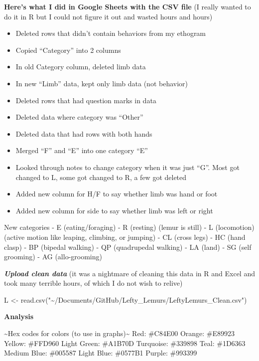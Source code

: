 \documentclass[
  letterpaper,
  DIV=11,
  numbers=noendperiod]{scrartcl}
\newenvironment{Shaded}{\begin{snugshade}}{\end{snugshade}}
\newcommand{\FunctionTok}[1]{\textcolor[rgb]{0.28,0.35,0.67}{#1}}
\newcommand{\NormalTok}[1]{\textcolor[rgb]{0.00,0.23,0.31}{#1}}
\newcommand{\OtherTok}[1]{\textcolor[rgb]{0.00,0.23,0.31}{#1}}
\newcommand{\StringTok}[1]{\textcolor[rgb]{0.13,0.47,0.30}{#1}}
\providecommand{\tightlist}{%
  \setlength{\itemsep}{0pt}\setlength{\parskip}{0pt}}\usepackage{longtable,booktabs,array}
\begin{document}
\textbf{Here's what I did in Google Sheets with the CSV file} (I really
wanted to do it in R but I could not figure it out and wasted hours and
hours)

\begin{itemize}
\tightlist
\item
  Deleted rows that didn't contain behaviors from my ethogram
\item
  Copied ``Category'' into 2 columns
\item
  In old Category column, deleted limb data
\item
  In new ``Limb'' data, kept only limb data (not behavior)
\item
  Deleted rows that had question marks in data
\item
  Deleted data where category was ``Other''
\item
  Deleted data that had rows with both hands
\item
  Merged ``F'' and ``E'' into one category ``E''
\item
  Looked through notes to change category when it was just ``G''. Most
  got changed to L, some got changed to R, a few got deleted
\item
  Added new column for H/F to say whether limb was hand or foot
\item
  Added new column for side to say whether limb was left or right
\end{itemize}

New categories - E (eating/foraging) - R (resting) (lemur is still) - L
(locomotion) (active motion like leaping, climbing, or jumping) - CL
(cross legs) - HC (hand clasp) - BP (bipedal walking) - QP (quadrupedal
walking) - LA (land) - SG (self grooming) - AG (allo-grooming)

\textbf{\emph{Upload clean data}} (it was a nightmare of cleaning this
data in R and Excel and took many terrible hours, of which I do not wish
to relive)

\begin{Shaded}
\begin{Highlighting}[]
\NormalTok{L }\OtherTok{\textless{}{-}} \FunctionTok{read.csv}\NormalTok{(}\StringTok{"\textasciitilde{}/Documents/GitHub/Lefty\_Lemurs/LeftyLemurs\_Clean.csv"}\NormalTok{)}
\end{Highlighting}
\end{Shaded}

\textbf{Analysis}

\textasciitilde Hex codes for colors (to use in graphs)\textasciitilde{}
Red: \#C84E00 Orange: \#E89923 Yellow: \#FFD960 Light Green: \#A1B70D
Turquoise: \#339898 Teal: \#1D6363 Medium Blue: \#005587 Light Blue:
\#0577B1 Purple: \#993399
\end{document}

